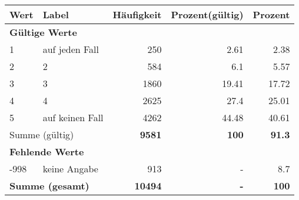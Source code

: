      \begin{longtable}{lXrrr}
     \toprule
     \textbf{Wert} & \textbf{Label} & \textbf{Häufigkeit} & \textbf{Prozent(gültig)} & \textbf{Prozent} \\
     \endhead
     \midrule
     \multicolumn{5}{l}{\textbf{Gültige Werte}}\\

     1 &
     \multicolumn{1}{X}{ auf jeden Fall   } &


       \num{250} &
       \num[round-mode=places,round-precision=2]{2,61} &
         \num[round-mode=places,round-precision=2]{2,38} \\

     2 &
     \multicolumn{1}{X}{ 2   } &


       \num{584} &
       \num[round-mode=places,round-precision=2]{6,1} &
         \num[round-mode=places,round-precision=2]{5,57} \\

     3 &
     \multicolumn{1}{X}{ 3   } &


       \num{1860} &
       \num[round-mode=places,round-precision=2]{19,41} &
         \num[round-mode=places,round-precision=2]{17,72} \\

     4 &
     \multicolumn{1}{X}{ 4   } &


       \num{2625} &
       \num[round-mode=places,round-precision=2]{27,4} &
         \num[round-mode=places,round-precision=2]{25,01} \\

     5 &
     \multicolumn{1}{X}{ auf keinen Fall   } &


       \num{4262} &
       \num[round-mode=places,round-precision=2]{44,48} &
         \num[round-mode=places,round-precision=2]{40,61} \\
     \midrule
     \multicolumn{2}{l}{Summe (gültig)} &
       \textbf{\num{9581}} &
     \textbf{100} &
       \textbf{\num[round-mode=places,round-precision=2]{91,3}} \\
     \multicolumn{5}{l}{\textbf{Fehlende Werte}}\\
       -998 &
       keine Angabe &
         \num{913} &
        - &
         \num[round-mode=places,round-precision=2]{8,7} \\
     \midrule
     \multicolumn{2}{l}{\textbf{Summe (gesamt)}} &
          \textbf{\num{10494}} &
        \textbf{-} &
        \textbf{100} \\
     \bottomrule
     \end{longtable}
     
